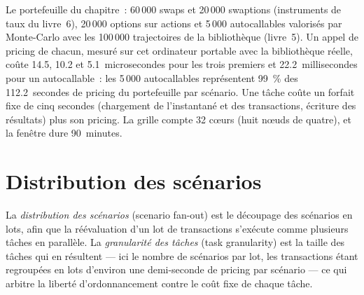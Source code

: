 Le portefeuille du chapitre~: 60\,000 swaps et 20\,000 swaptions (instruments de taux du livre~6), 20\,000 options sur actions et 5\,000 autocallables
valorisés par Monte-Carlo avec les 100\,000 trajectoires de la bibliothèque (livre~5). Un appel de pricing de chacun, mesuré sur cet ordinateur portable avec la bibliothèque réelle,
coûte 14.5, 10.2 et 5.1~microsecondes pour les trois premiers et 22.2~millisecondes pour un autocallable~: les 5\,000 autocallables représentent 99~\% des
112.2~secondes de pricing du portefeuille par scénario. Une tâche coûte un forfait fixe de cinq secondes (chargement de l'instantané et des transactions, écriture des résultats)
plus son pricing. La grille compte 32 cœurs (huit nœuds de quatre), et la fenêtre dure 90~minutes.

\section{Distribution des scénarios}

\begin{definition}\label{def:pl:the-risk-grid:fanout}
La \emph{distribution des scénarios} (scenario fan-out) est le découpage des scénarios en lots, afin que la réévaluation d'un lot de transactions s'exécute comme
plusieurs tâches en parallèle. La \emph{granularité des tâches} (task granularity) est la taille des tâches qui en résultent --- ici le nombre de scénarios
par lot, les transactions étant regroupées en lots d'environ une demi-seconde de pricing par scénario --- ce qui arbitre la liberté d'ordonnancement contre
le coût fixe de chaque tâche.
\end{definition}

\begin{omfigure}

\label{fig:pl:the-risk-grid:tasks}
\end{omfigure}


